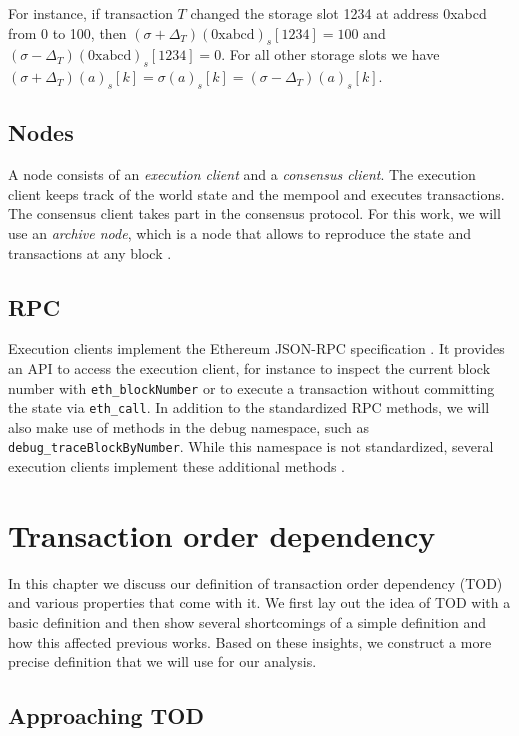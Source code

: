 \documentclass[draft,final]{vutinfth} %
\begin{document}
For instance, if transaction $T$ changed the storage slot 1234 at address 0xabcd from 0 to 100, then $(\sigma + \Delta_T)(\text{0xabcd})_s[1234] = 100$ and $(\sigma - \Delta_T)(\text{0xabcd})_s[1234] = 0$. For all other storage slots we have $(\sigma + \Delta_T)(a)_s[k] = \sigma(a)_s[k] = (\sigma - \Delta_T)(a)_s[k]$.

\section{Nodes}

A node consists of an \emph{execution client} and a \emph{consensus client}. The execution client keeps track of the world state and the mempool and executes transactions. The consensus client takes part in the consensus protocol. For this work, we will use an \emph{archive node}, which is a node that allows to reproduce the state and transactions at any block \cite{noauthor_nodes_2024}.

\section{RPC}

Execution clients implement the Ethereum JSON-RPC specification \cite{noauthor_ethereum_2024}. It provides an API to access the execution client, for instance to inspect the current block number with \verb|eth_blockNumber| or to execute a transaction without committing the state via \verb|eth_call|. In addition to the standardized RPC methods, we will also make use of methods in the debug namespace, such as \verb|debug_traceBlockByNumber|. While this namespace is not standardized, several execution clients implement these additional methods \cite{noauthor_debug_2024}\cite{noauthor_rpc_2024}\cite{noauthor_reth_2024}.

\chapter{Transaction order dependency}

In this chapter we discuss our definition of transaction order dependency (TOD) and various properties that come with it. We first lay out the idea of TOD with a basic definition and then show several shortcomings of a simple definition and how this affected previous works. Based on these insights, we construct a more precise definition that we will use for our analysis.

\section{Approaching TOD}
\end{document}
